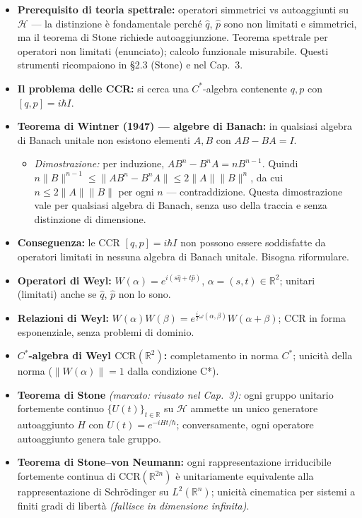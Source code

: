 \documentclass[12pt, a4paper]{article}
\begin{document}
	\begin{itemize}
		\item \textbf{Prerequisito di teoria spettrale:} operatori simmetrici vs
		autoaggiunti su $\mathcal{H}$ --- la distinzione è fondamentale perché
		$\hat q$, $\hat p$ sono non limitati e simmetrici, ma il teorema di Stone
		richiede autoaggiunzione. Teorema spettrale per operatori non limitati (enunciato);
		calcolo funzionale misurabile. Questi strumenti ricompaiono in \S2.3 (Stone)
		e nel Cap.~3.
		\item \textbf{Il problema delle CCR:} si cerca una $C^*$-algebra contenente
		$q,p$ con $[q,p]=i\hbar I$.
		\item \textbf{Teorema di Wintner (1947) --- algebre di Banach:} in qualsiasi
		algebra di Banach unitale non esistono elementi $A,B$ con $AB-BA=I$.
		\begin{itemize}
			\item \textit{Dimostrazione:} per induzione, $AB^n-B^nA=nB^{n-1}$. Quindi
			$n\|B\|^{n-1}\leq\|AB^n-B^nA\|\leq 2\|A\|\|B\|^n$, da cui $n\leq 2\|A\|\|B\|$
			per ogni $n$ --- contraddizione. Questa dimostrazione vale per qualsiasi
			algebra di Banach, senza uso della traccia e senza distinzione di dimensione.
		\end{itemize}
		\item \textbf{Conseguenza:} le CCR $[q,p]=i\hbar I$ non possono essere soddisfatte
		da operatori limitati in nessuna algebra di Banach unitale. Bisogna riformulare.
		\item \textbf{Operatori di Weyl:} $W(\alpha)=e^{i(s\hat q+t\hat p)}$,
		$\alpha=(s,t)\in\mathbb{R}^2$; unitari (limitati) anche se $\hat q$, $\hat p$
		non lo sono.
		\item \textbf{Relazioni di Weyl:} $W(\alpha)W(\beta)=e^{\frac{i}{2}\omega(\alpha,\beta)}
		W(\alpha+\beta)$; CCR in forma esponenziale, senza problemi di dominio.
		\item \textbf{$C^*$-algebra di Weyl $\mathrm{CCR}(\mathbb{R}^2)$:} completamento
		in norma $C^*$; unicità della norma ($\|W(\alpha)\|=1$ dalla condizione C*).
		\item \textbf{Teorema di Stone} \emph{(marcato: riusato nel Cap.~3):} ogni gruppo
		unitario fortemente continuo $\{U(t)\}_{t\in\mathbb{R}}$ su $\mathcal{H}$ ammette
		un unico generatore autoaggiunto $H$ con $U(t)=e^{-iHt/\hbar}$; conversamente,
		ogni operatore autoaggiunto genera tale gruppo.
		\item \textbf{Teorema di Stone--von Neumann:} ogni rappresentazione irriducibile
		fortemente continua di $\mathrm{CCR}(\mathbb{R}^{2n})$ è unitariamente equivalente
		alla rappresentazione di Schrödinger su $L^2(\mathbb{R}^n)$; unicità cinematica
		per sistemi a finiti gradi di libertà \emph{(fallisce in dimensione infinita)}.
	\end{itemize}
	
\end{document}
